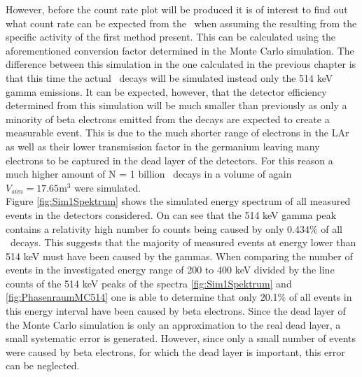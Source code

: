 However, before the count rate plot will be produced it is of interest to find out what count rate can be expected from the \Kr\ when assuming the resulting from the specific activity of the first method present.
This can be calculated using the aforementioned conversion factor determined in the Monte Carlo simulation.
The difference between this simulation in the one calculated in the previous chapter is that this time the actual \Kr\ decays will be simulated instead only the 514 keV gamma emissions.
It can be expected, however, that the detector efficiency determined from this simulation will be much smaller than previously as only a minority of beta electrons emitted from the decays are expected to create a measurable event.
This is due to the much shorter range of electrons in the LAr as well as their lower transmission factor in the germanium leaving many electrons to be captured in the dead layer of the detectors.
For this reason a much higher amount of N = 1 billion \Kr\ decays in a volume of again $V_{sim} = 17.65 \mathrm{m}^3$ were simulated.
\\

Figure \ref{fig:Sim1Spektrum} shows the simulated energy spectrum of all measured events in the detectors considered.
On can see that the 514 keV gamma peak contains a relativity high number fo counts being caused by only 0.434$\%$ of all \Kr\ decays.
This suggests that the majority of measured events at energy lower than 514 keV must have been caused by the gammas.
When comparing the number of events in the investigated energy range of 200 to 400 keV divided by the line counts of the 514 keV peaks of the spectra \ref{fig:Sim1Spektrum} and \ref{fig:PhasenraumMC514} one is able to determine that only 20.1$\%$ of all events in this energy interval have been caused by beta electrons.
Since the dead layer of the Monte Carlo simulation is only an approximation to the real dead layer, a small systematic error is generated. 
However, since only a small number of events were caused by beta electrons, for which the dead layer is important, this error can be neglected. 
\\

